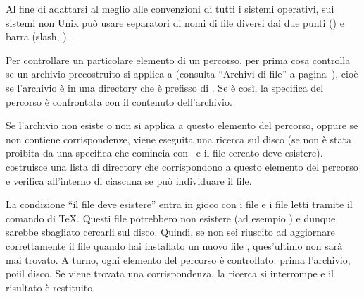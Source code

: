 \documentclass{article}
\begin{document}
Al fine di adattarsi al meglio alle convenzioni di tutti i sistemi
operativi, sui sistemi non Unix \KPS{} può usare separatori di nomi di
file diversi dai due punti (\samp{:}) e barra (slash, \samp{/}).

Per controllare un particolare elemento  di un percorso, \KPS{} per
prima cosa controlla se un archivio precostruito si applica a 
(consulta ``Archivi di file'' a pagina~\pageref{sec:filename-database}),
cioè se l'archivio è in una directory che è prefisso di . Se è
così, la specifica del percorso è confrontata con il contenuto
dell'archivio.

Se l'archivio non esiste o non si applica a questo elemento del percorso,
oppure se non contiene corrispondenze, viene eseguita una ricerca sul
disco (se non è stata proibita da una specifica che comincia con \samp{!!}\
e il file cercato deve esistere). \KPS{} costruisce una lista di directory
che corrispondono a questo elemento del percorso e verifica all'interno di
ciascuna se può individuare il file.

La condizione ``il file deve esistere'' entra in gioco con i file
\samp{.vf} e i file letti tramite il comando \cs{openin} di \TeX. Questi
file potrebbero non esistere (ad esempio \file{cmr10.vf}) e dunque sarebbe
sbagliato cercarli sul disco. Quindi, se non sei riuscito ad aggiornare
correttamente il file \file{ls-R} quando hai installato un nuovo file
\samp{.vf}, ques'ultimo non sarà mai trovato. A turno, ogni elemento del
percorso è controllato: prima l'archivio, poiil disco. Se viene trovata
una corrispondenza, la ricerca si interrompe e il risultato è restituito. 
\end{document}

